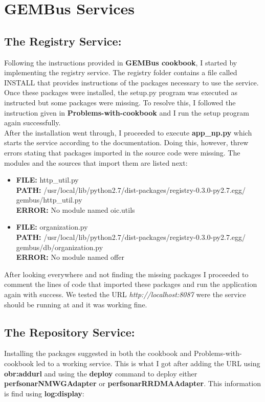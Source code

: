 \documentclass[12 pt, twoside]{article}
\begin{document}
	\section{GEMBus Services}
	{
		\subsection{The Registry Service:}
		{
			Following the instructions provided in \textbf{GEMBus cookbook}, I started by implementing the registry service. The registry folder contains a file called INSTALL that provides instructions of the packages necessary to use the service. Once these packages were installed, the setup.py program was executed as instructed but some packages were missing. To resolve this, I followed the instruction given in \textbf{Problems-with-cookbook} and I run the setup program again successfully.  \\
			
			After the installation went through, I proceeded to execute \textbf{app\_np.py} which starts the service according to the documentation. Doing this, however, threw errors stating that packages imported in the source code were missing. The modules and the sources that import them are listed next:
			
			\begin{itemize}
				\item \textbf{FILE:} http\_util.py \\
				\textbf{PATH:} /usr/local/lib/python2.7/dist-packages/registry-0.3.0-py2.7.egg/ \\ gembus/http\_util.py \\
				\textbf{ERROR:} No module named oic.utils
				\item \textbf{FILE:} organization.py \\
				\textbf{PATH:} /usr/local/lib/python2.7/dist-packages/registry-0.3.0-py2.7.egg/ \\ gembus/db/organization.py \\
				\textbf{ERROR:} No module named offer
			\end{itemize}
			
			After looking everywhere and not finding the missing packages I proceeded to comment the lines of code that imported these packages and run the application again with success. We tested the URL \textit{http://localhost:8087} were the service should be running at and it was working fine.
		}
		
		\subsection{The Repository Service:}
		{
			Installing the packages suggested in both the cookbook and Problems-with-cookbook led to a working service. This is what I got after adding the URL using \textbf{obr:addurl} and using the \textbf{deploy} command to deploy either \textbf{perfsonarNMWGAdapter} or \textbf{perfsonarRRDMAAdapter}. This information is find using \textbf{log:display}: \\
			
}}
\end{document}
